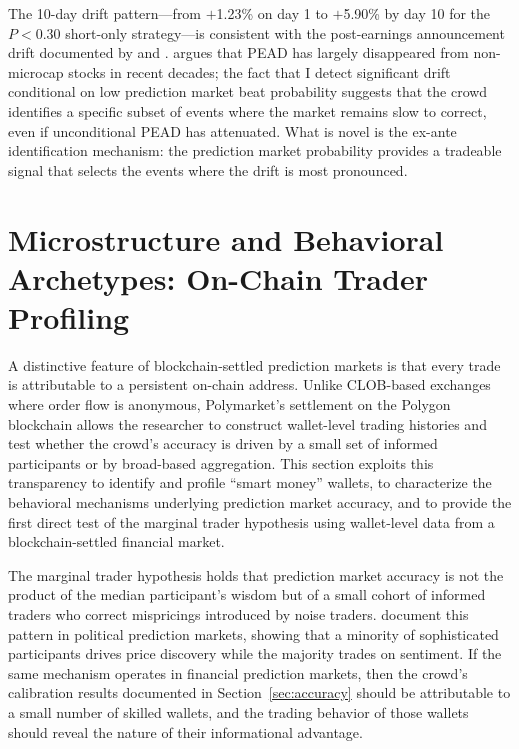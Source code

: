 \documentclass[11pt]{article}
\begin{document}
The 10-day drift pattern---from $+$1.23\% on day 1 to $+$5.90\% by day 10 for the $P < 0.30$ short-only strategy---is consistent with the post-earnings announcement drift documented by \citet{bernard1989post} and \citet{livnat2006comparing}. \citet{martineau2022pead} argues that PEAD has largely disappeared from non-microcap stocks in recent decades; the fact that I detect significant drift conditional on low prediction market beat probability suggests that the crowd identifies a specific subset of events where the market remains slow to correct, even if unconditional PEAD has attenuated. What is novel is the ex-ante identification mechanism: the prediction market probability provides a tradeable signal that selects the events where the drift is most pronounced.

\section{Microstructure and Behavioral Archetypes: On-Chain Trader Profiling} \label{sec:micro}

A distinctive feature of blockchain-settled prediction markets is that every trade is attributable to a persistent on-chain address. Unlike CLOB-based exchanges where order flow is anonymous, Polymarket's settlement on the Polygon blockchain allows the researcher to construct wallet-level trading histories and test whether the crowd's accuracy is driven by a small set of informed participants or by broad-based aggregation. This section exploits this transparency to identify and profile ``smart money'' wallets, to characterize the behavioral mechanisms underlying prediction market accuracy, and to provide the first direct test of the marginal trader hypothesis \citep{forsythe1992anatomy} using wallet-level data from a blockchain-settled financial market.

The marginal trader hypothesis holds that prediction market accuracy is not the product of the median participant's wisdom but of a small cohort of informed traders who correct mispricings introduced by noise traders. \citet{rothschild2016trading} document this pattern in political prediction markets, showing that a minority of sophisticated participants drives price discovery while the majority trades on sentiment. If the same mechanism operates in financial prediction markets, then the crowd's calibration results documented in Section~\ref{sec:accuracy} should be attributable to a small number of skilled wallets, and the trading behavior of those wallets should reveal the nature of their informational advantage.
\end{document}
